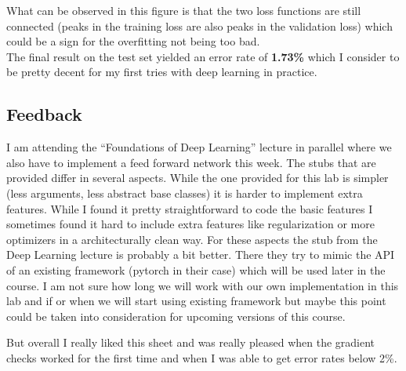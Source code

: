 \documentclass{scrartcl}
\begin{document}
What can be observed in this figure is that the two loss functions are still connected (peaks in the training loss are also peaks in the validation loss) which could be a sign for the overfitting not being too bad. \\
The final result on the test set yielded an error rate of \textbf{1.73\%} which I consider to be pretty decent for my first tries with deep learning in practice.
\subsection*{Feedback}
I am attending the \enquote{Foundations of Deep Learning} lecture in parallel where we also have to implement a feed forward network this week. The stubs that are provided differ in several aspects. While the one provided for this lab is simpler (less arguments, less abstract base classes) it is harder to implement extra features. While I found it pretty straightforward to code the basic features I sometimes found it hard to include extra features like regularization or more optimizers in a architecturally clean way. For these aspects the stub from the Deep Learning lecture is probably a bit better. There they try to mimic the API of an existing framework (pytorch in their case) which will be used later in the course. I am not sure how long we will work with our own implementation in this lab and if or when we will start using existing framework but maybe this point could be taken into consideration for upcoming versions of this course.

But overall I really liked this sheet and was really pleased when the gradient checks worked for the first time and when I was able to get error rates below 2\%.
\end{document}
